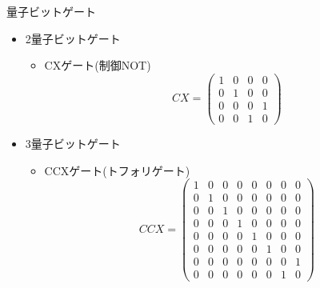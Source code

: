 \begin{frame}[t,fragile]{量子ビットゲート}
  \begin{itemize}
  \item 2量子ビットゲート
    \begin{itemize}
    \item CXゲート(制御NOT)
      \[
      CX = \begin{pmatrix} 1 & 0 & 0 & 0 \\ 0 & 1 & 0 & 0 \\ 0 & 0 & 0 & 1 \\ 0 & 0 & 1 & 0 \end{pmatrix}
      \]
    \end{itemize}
  \item 3量子ビットゲート
    \begin{itemize}
    \item CCXゲート(トフォリゲート)
      \[
      CCX = \begin{pmatrix}
        1 & 0 & 0 & 0 & 0 & 0 & 0 & 0 \\
        0 & 1 & 0 & 0 & 0 & 0 & 0 & 0 \\
        0 & 0 & 1 & 0 & 0 & 0 & 0 & 0 \\
        0 & 0 & 0 & 1 & 0 & 0 & 0 & 0 \\
        0 & 0 & 0 & 0 & 1 & 0 & 0 & 0 \\
        0 & 0 & 0 & 0 & 0 & 1 & 0 & 0 \\
        0 & 0 & 0 & 0 & 0 & 0 & 0 & 1 \\
        0 & 0 & 0 & 0 & 0 & 0 & 1 & 0 \end{pmatrix}
      \]
    \end{itemize}
  \end{itemize}
\end{frame}

